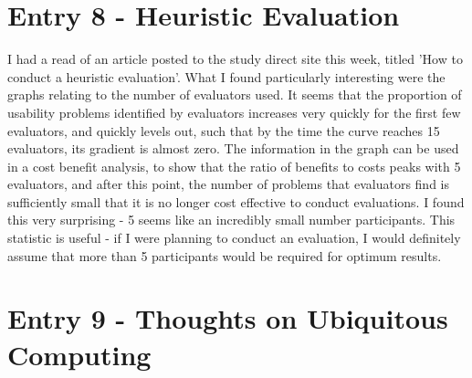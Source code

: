 \documentclass{article}
\begin{document}
\section*{Entry 8 - Heuristic Evaluation}

\noindent I had a read of an article posted to the study direct site this week, titled 'How to conduct a heuristic evaluation'. What I found particularly interesting were the graphs relating to the number of evaluators used. It seems that the proportion of usability problems identified by evaluators increases very quickly for the first few evaluators, and quickly levels out, such that by the time the curve reaches 15 evaluators, its gradient is almost zero. The information in the graph can be used in a cost benefit analysis, to show that the ratio of benefits to costs peaks with 5 evaluators, and after this point, the number of problems that evaluators find is sufficiently small that it is no longer cost effective to conduct evaluations. I found this very surprising - 5 seems like an incredibly small number participants. This statistic is useful - if I were planning to conduct an evaluation, I would definitely assume that more than 5 participants would be required for optimum results.

\section*{Entry 9 - Thoughts on Ubiquitous Computing}
\end{document}
